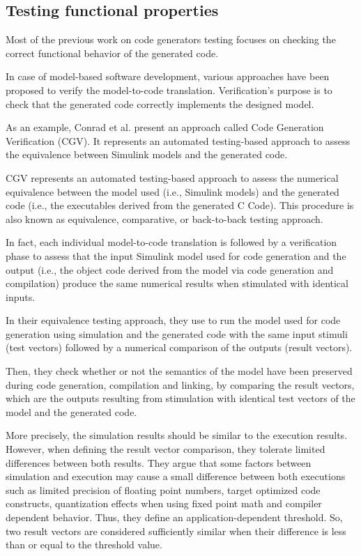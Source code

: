 \subsection{Testing functional properties}
 
Most of the previous work on code generators testing focuses on checking the correct functional behavior of the generated code\cite{stuermer2007systematic,zelenov2006automatic,conrad2009testing,conrad2010code,jorges2014back}.

In case of model-based software development, various approaches have been proposed to verify the model-to-code translation. Verification's purpose is to check that the generated code correctly implements the designed model.

As an example, Conrad et al.\cite{conrad2010code,conrad2009testing} present an approach called Code Generation Verification (CGV). It represents an automated testing-based approach to assess the equivalence between Simulink models and the generated code. 

CGV represents an automated testing-based approach to assess the numerical equivalence between the model used (i.e., Simulink models) and the generated code (i.e., the executables derived from the generated C Code). This procedure is also known as equivalence, comparative, or back-to-back testing approach\cite{vouk1990back,mckeeman1998differential}.

In fact, each individual model-to-code translation is followed by a verification phase to assess that the input Simulink model used for code generation and the output (i.e., the object code derived from the model via code generation and compilation) produce the same numerical results when stimulated with identical inputs. 

In their equivalence testing approach, they use to run the model used for code generation using simulation and the generated code with the same input stimuli (test vectors) followed by a numerical comparison of the outputs (result vectors).

Then, they check whether or not the semantics of the model have been preserved during code generation, compilation and linking, by comparing the result vectors, which are the outputs resulting from stimulation with identical test vectors of the model and the generated code.
 
More precisely, the simulation results should be similar to the execution results. However, when defining the result vector comparison, they tolerate limited differences between both results. They argue that some factors between simulation and execution may cause a small difference between both executions such as limited precision of floating point numbers, target optimized code constructs, quantization effects when using fixed point math and compiler dependent behavior. 
Thus, they define an application-dependent threshold. So, two result vectors are considered sufficiently similar when their difference is less than or equal to the threshold value.

